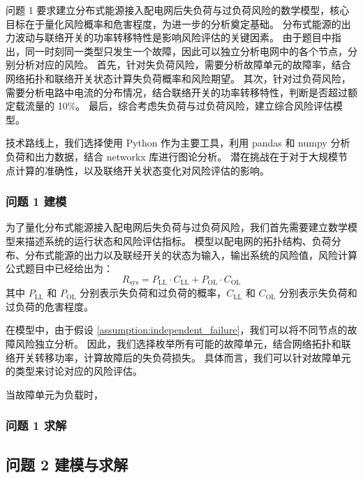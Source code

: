 \documentclass{article}
\begin{document}
问题 1 要求建立分布式能源接入配电网后失负荷与过负荷风险的数学模型，核心目标在于量化风险概率和危害程度，为进一步的分析奠定基础。
分布式能源的出力波动与联络开关的功率转移特性是影响风险评估的关键因素。
由于题目中指出，同一时刻同一类型只发生一个故障，因此可以独立分析电网中的各个节点，分别分析对应的风险。
首先，针对失负荷风险，需要分析故障单元的故障率，结合网络拓扑和联络开关状态计算失负荷概率和风险期望。
其次，针对过负荷风险，需要分析电路中电流的分布情况，结合联络开关的功率转移特性，判断是否超过额定载流量的 10\%。
最后，综合考虑失负荷与过负荷风险，建立综合风险评估模型。

技术路线上，我们选择使用 Python 作为主要工具，利用 pandas 和 numpy 分析负荷和出力数据，结合 networkx 库进行图论分析。
潜在挑战在于对于大规模节点计算的准确性，以及联络开关状态变化对风险评估的影响。

\subsubsection{问题 1 建模}\label{subsubsec:problem1_model}

为了量化分布式能源接入配电网后失负荷与过负荷风险，我们首先需要建立数学模型来描述系统的运行状态和风险评估指标。
模型以配电网的拓扑结构、负荷分布、分布式能源的出力以及联经开关的状态为输入，输出系统的风险值，风险计算公式题目中已经给出为：
\begin{equation}\label{eq:risk_formula}
  R_{\text{sys}} = P_{\text{LL}} \cdot C_{\text{LL}} + P_{\text{OL}} \cdot C_{\text{OL}}
\end{equation}
其中 $P_{\text{LL}}$ 和 $P_{\text{OL}}$ 分别表示失负荷和过负荷的概率，$C_{\text{LL}}$ 和 $C_{\text{OL}}$ 分别表示失负荷和过负荷的危害程度。

在模型中，由于假设 \ref{assumption:independent_failure}，我们可以将不同节点的故障风险独立分析。
因此，我们选择枚举所有可能的故障单元，结合网络拓扑和联络开关转移功率，计算故障后的失负荷损失。
具体而言，我们可以针对故障单元的类型来讨论对应的风险评估。

当故障单元为负载时，

\subsubsection{问题 1 求解}\label{subsubsec:problem1_solve}

\subsection{问题 2 建模与求解}\label{subsec:problem2}
\end{document}
